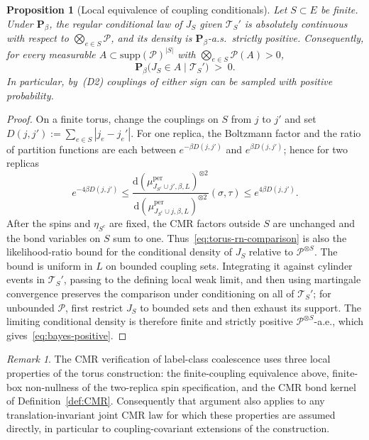 \documentclass[11pt]{article}
\newtheorem{proposition}[theorem]{Proposition}
\numberwithin{theorem}{section}
\theoremstyle{remark}
\newtheorem{remark}[theorem]{Remark}
\begin{document}
\begin{proposition}[Local equivalence of coupling conditionals]\label{prop:bayes}
Let $S \subset E$ be finite.
Under $\mathbf{P}_\beta$, the regular conditional law of $J_S$ given $\mathcal{T}_S'$ is absolutely continuous with respect to $\bigotimes_{e \in S} \mathscr{P}$, and its density is $\mathbf{P}_\beta$-a.s.\ strictly positive.
Consequently, for every measurable $A \subset \mathrm{supp}(\mathscr{P})^{|S|}$ with $\bigotimes_{e \in S} \mathscr{P}(A) > 0$,
\begin{equation}\label{eq:bayes-positive}
  \mathbf{P}_\beta\bigl(J_S \in A \mid \mathcal{T}_S'\bigr)
  \;>\; 0.
\end{equation}
In particular, by~\textup{(D2)} couplings of either sign can be sampled with positive probability.
\end{proposition}

\begin{proof}
On a finite torus, change the couplings on $S$ from $j$ to $j'$ and set
$D(j,j'):=\sum_{e\in S}|j_e-j_e'|$.
For one replica, the Boltzmann factor and the ratio of partition functions are each between $e^{-\beta D(j,j')}$ and $e^{\beta D(j,j')}$; hence for two replicas
\begin{equation}\label{eq:torus-rn-comparison}
  e^{-4\beta D(j,j')}
  \leq
  \frac{\mathrm{d}(\mu_{J_{S^c}\cup j',\beta,L}^{\mathrm{per}})^{\otimes 2}}
       {\mathrm{d}(\mu_{J_{S^c}\cup j,\beta,L}^{\mathrm{per}})^{\otimes 2}}
       (\sigma,\tau)
  \leq
  e^{4\beta D(j,j')}.
\end{equation}
After the spins and $\eta_{S^c}$ are fixed, the CMR factors outside $S$ are unchanged and the bond variables on $S$ sum to one.
Thus~\eqref{eq:torus-rn-comparison} is also the likelihood-ratio bound for the conditional density of $J_S$ relative to $\mathscr{P}^{\otimes S}$.
The bound is uniform in $L$ on bounded coupling sets.
Integrating it against cylinder events in $\mathcal{T}_S'$, passing to the defining local weak limit, and then using martingale convergence preserves the comparison under conditioning on all of $\mathcal{T}_S'$; for unbounded $\mathscr{P}$, first restrict $J_S$ to bounded sets and then exhaust its support.
The limiting conditional density is therefore finite and strictly positive $\mathscr{P}^{\otimes S}$-a.e., which gives~\eqref{eq:bayes-positive}.
\end{proof}

\begin{remark}
The CMR verification of label-class coalescence uses three local properties of the torus construction: the finite-coupling equivalence above, finite-box non-nullness of the two-replica spin specification, and the CMR bond kernel of Definition~\ref{def:CMR}.
Consequently that argument also applies to any translation-invariant joint CMR law for which these properties are assumed directly, in particular to coupling-covariant extensions of the construction.
\end{remark}
\end{document}

